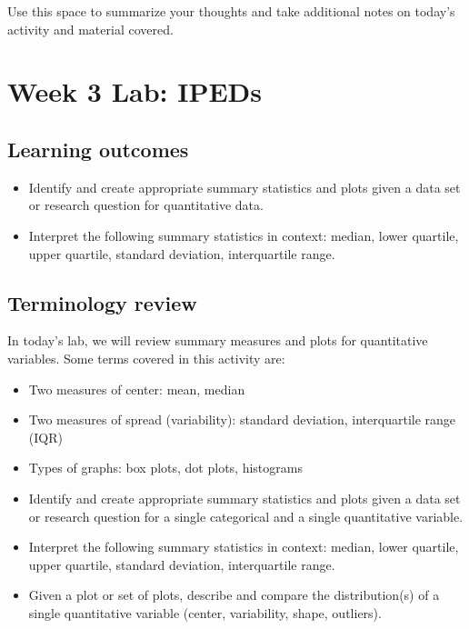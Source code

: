 \documentclass[
]{report}
\begin{document}
Use this space to summarize your thoughts and take additional notes on today's activity and material covered.

\newpage

\hypertarget{week-3-lab-ipeds}{%
\section{Week 3 Lab: IPEDs}\label{week-3-lab-ipeds}}


\hypertarget{learning-outcomes-5}{%
\subsection{Learning outcomes}\label{learning-outcomes-5}}

\begin{itemize}
\item
  Identify and create appropriate summary statistics and plots
  given a data set or research question for quantitative data.
\item
  Interpret the following summary statistics in context:
  median, lower quartile, upper quartile,
  standard deviation, interquartile range.
\end{itemize}

\hypertarget{terminology-review-5}{%
\subsection{Terminology review}\label{terminology-review-5}}

In today's lab, we will review summary measures and plots for quantitative variables. Some terms covered in this activity are:

\begin{itemize}
\item
  Two measures of center: mean, median
\item
  Two measures of spread (variability): standard deviation, interquartile range (IQR)
\item
  Types of graphs: box plots, dot plots, histograms
\item
  Identify and create appropriate summary statistics and plots given a data set or research question for a single categorical and a single quantitative variable.
\item
  Interpret the following summary statistics in context:
  median, lower quartile, upper quartile,
  standard deviation, interquartile range.
\item
  Given a plot or set of plots, describe and compare the distribution(s)
  of a single quantitative variable
  (center, variability, shape, outliers).
\end{itemize}
\end{document}
